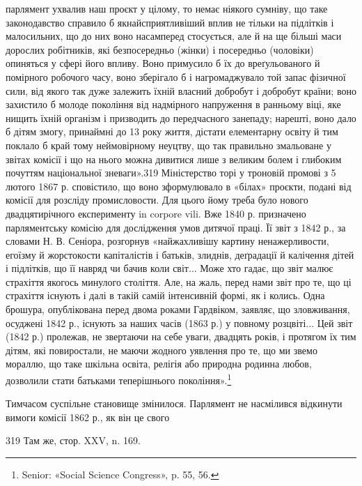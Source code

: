 парлямент ухвалив наш проєкт у цілому, то немає ніякого сумніву,
що таке законодавство справило б якнайсприятливіший
вплив не тільки на підлітків і малосильних, що до них воно
насамперед стосується, але й на ще більші маси дорослих робітників,
які безпосередньо (жінки) і посередньо (чоловіки) опиняться
у сфері його впливу. Воно примусило б їх до вреґульованого
й помірного робочого часу, воно зберігало б і нагромаджувало
той запас фізичної сили, від якого так дуже залежить їхній
власний добробут і добробут країни; воно захистило б молоде
покоління від надмірного напруження в ранньому віці, яке
нищить їхній організм і призводить до передчасного занепаду;
нарешті, воно дало б дітям змогу, принаймні до 13 року життя,
дістати елементарну освіту й тим поклало б край тому неймовірному
неуцтву, що так правильно змальоване у звітах комісії
і що на нього можна дивитися лише з великим болем і глибоким
почуттям національної зневаги».319 Міністерство торі у троновій
промові з 5 лютого 1867 р. сповістило, що воно зформулювало в
«білах» проєкти, подані від комісії для розсліду промисловости.
Для цього йому треба було нового двадцятирічного
експерименту in corpore vili. Вже 1840 р. призначено парляментську
комісію для дослідження умов дитячої праці. Її звіт з 1842 р.,
за словами Н. В. Сеніора, розгорнув «найжахливішу картину
ненажерливости, егоїзму й жорстокости капіталістів і батьків,
злиднів, деґрадації й калічення дітей і підлітків, що її навряд
чи бачив коли світ... Може хто гадає, що звіт малює страхіття
якогось минулого століття. Але, на жаль, перед нами звіт про
те, що ці страхіття існують і далі в такій самій інтенсивній формі,
як і колись. Одна брошура, опублікована перед двома роками
Гардвіком, заявляє, що зловживання, осуджені 1842 р.,
існують за наших часів (1863 р.) у повному розцвіті... Цей звіт
(1842 р.) пролежав, не звертаючи на себе уваги, двадцять років,
і протягом їх тим дітям, які повиростали, не маючи жодного
уявлення про те, що ми звемо мораллю, що таке шкільна освіта,
релігія або природна родинна любов, дозволили стати батьками
теперішнього покоління».\footnote{
Senior: «Social Science Congress», p. 55, 56.
}

Тимчасом суспільне становище змінилося. Парлямент не
насмілився відкинути вимоги комісії 1862 р., як він це свого

319 Там же, стор. XXV, n. 169.
